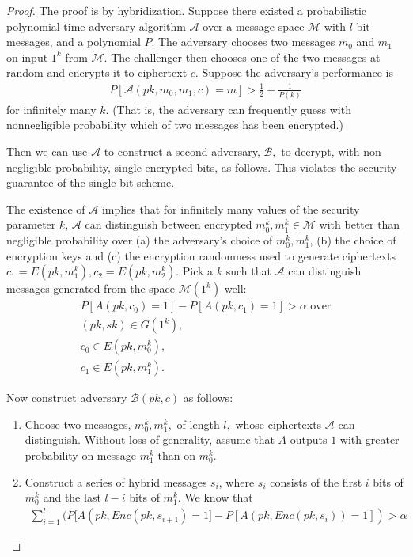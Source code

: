 \documentclass[10pt]{article}
\begin{document}
\begin{proof}
The proof is by hybridization. Suppose there existed a probabilistic polynomial time adversary algorithm $\mathcal A$ over a message space $\mathcal M$ with $l$ bit messages, and a polynomial $P$. The adversary chooses two messages $m_0$ and $m_1$ on input $1^k$ from $\mathcal M.$ The challenger then chooses one of the two messages at random and encrypts it to ciphertext $c$. Suppose the adversary's performance is
\begin{align}
  P[\mathcal A(pk, m_0, m_1, c) = m] > \frac{1}{2} + \frac{1}{P(k)}
\end{align}
for infinitely many $k$. (That is, the adversary can frequently guess with nonnegligible probability which of two messages has been encrypted.)

Then we can use $\mathcal A$ to construct a second adversary, $\mathcal B,$ to decrypt, with non-negligible probability, single encrypted bits, as follows. This violates the security guarantee of the single-bit scheme. 

The existence of $\mathcal A$ implies that for infinitely many values of the security parameter $k$, $\mathcal A$ can distinguish between encrypted $m_0^k, m_1^k \in \mathcal M$ with better than negligible probability over (a) the adversary's choice of $m_0^k, m_1^k$, (b) the choice of encryption keys and (c) the encryption randomness used to generate ciphertexts $c_1 = E(pk, m_1^k), c_2 = E(pk, m_2^k)$. Pick a $k$ such that $\mathcal A$ can distinguish messages generated from the space $\mathcal M(1^k)$ well:
\begin{align}
  P[A(pk, c_0) = 1] - P[A(pk, c_1) = 1] > \alpha \text{ over} \\
  (pk,sk) \in G(1^k), \\
  c_0 \in E(pk, m_0^k), \\
  c_1 \in E(pk, m_1^k).
\end{align}

Now construct adversary $\mathcal B(pk, c)$ as follows:
\begin{enumerate}
  \item Choose two messages, $m_0^k, m_1^k,$ of length $l,$ whose ciphertexts $\mathcal A$ can distinguish. Without loss of generality, assume that $A$ outputs $1$ with greater probability on message $m_1^k$ than on $m_0^k.$
  \item Construct a series of hybrid messages $s_i$, where $s_i$ consists of the first $i$ bits of $m_0^k$ and the last $l - i$ bits of $m_1^k.$ We know that
  \begin{align}
    \sum_{i = 1}^l (P[A(pk, Enc(pk, s_{i+1}) = 1] - P[A(pk, Enc(pk, s_i)) = 1]) > \alpha
  \end{align}
  

\end{enumerate}
\end{proof}
\end{document}

